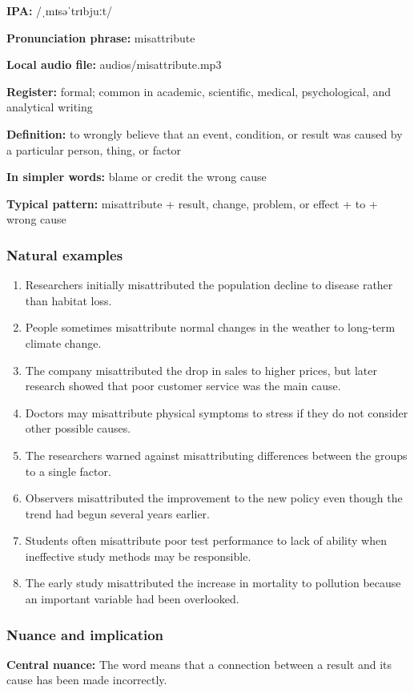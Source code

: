 \documentclass[11pt]{article}
\begin{document}
\textbf{IPA:} /ˌmɪsəˈtrɪbjuːt/

\textbf{Pronunciation phrase:} misattribute

\textbf{Local audio file:} audios/misattribute.mp3

\textbf{Register:} formal; common in academic, scientific, medical, psychological, and analytical writing

\textbf{Definition:} to wrongly believe that an event, condition, or result was caused by a particular person, thing, or factor

\textbf{In simpler words:} blame or credit the wrong cause

\textbf{Typical pattern:} misattribute + result, change, problem, or effect + to + wrong cause

\subsubsection{Natural examples}
\begin{enumerate}
  \item Researchers initially misattributed the population decline to disease rather than habitat loss.
  \item People sometimes misattribute normal changes in the weather to long-term climate change.
  \item The company misattributed the drop in sales to higher prices, but later research showed that poor customer service was the main cause.
  \item Doctors may misattribute physical symptoms to stress if they do not consider other possible causes.
  \item The researchers warned against misattributing differences between the groups to a single factor.
  \item Observers misattributed the improvement to the new policy even though the trend had begun several years earlier.
  \item Students often misattribute poor test performance to lack of ability when ineffective study methods may be responsible.
  \item The early study misattributed the increase in mortality to pollution because an important variable had been overlooked.
\end{enumerate}

\subsubsection{Nuance and implication}
\textbf{Central nuance:} The word means that a connection between a result and its cause has been made incorrectly.
\end{document}
